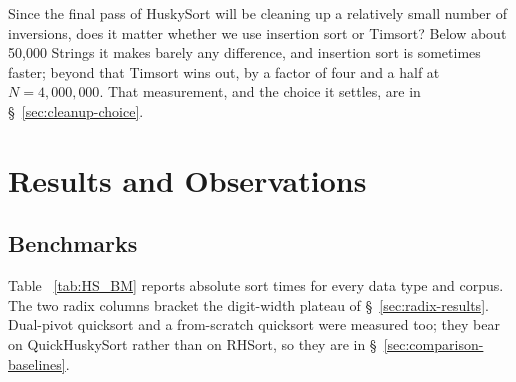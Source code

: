 \documentclass[twoside,leqno,twocolumn]{article}
\begin{document}
Since the final pass of HuskySort will be cleaning up a relatively small number of inversions, does it
matter whether we use insertion sort or Timsort?
Below about 50,000 Strings it makes barely any difference, and insertion sort is sometimes faster;
beyond that Timsort wins out, by a factor of four and a half at $N = 4{,}000{,}000$.
That measurement, and the choice it settles, are in \S~\ref{sec:cleanup-choice}.


\section{Results and Observations}
\subsection{Benchmarks}

Table ~\ref{tab:HS_BM} reports absolute sort times for every data type and corpus.
The two radix columns bracket the digit-width plateau of \S~\ref{sec:radix-results}.
Dual-pivot quicksort and a from-scratch quicksort were measured too; they bear on QuickHuskySort
rather than on RHSort, so they are in \S~\ref{sec:comparison-baselines}.
\end{document}
